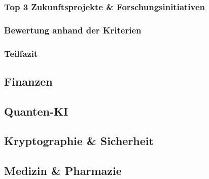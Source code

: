 \subsubsection*{Top 3 Zukunftsprojekte \& Forschungsinitiativen}
\subsubsection*{Bewertung anhand der Kriterien}
\subsubsection*{Teilfazit}


\subsection{Finanzen}

\subsection{Quanten-KI}

\subsection{Kryptographie \& Sicherheit}

\subsection{Medizin \& Pharmazie}

